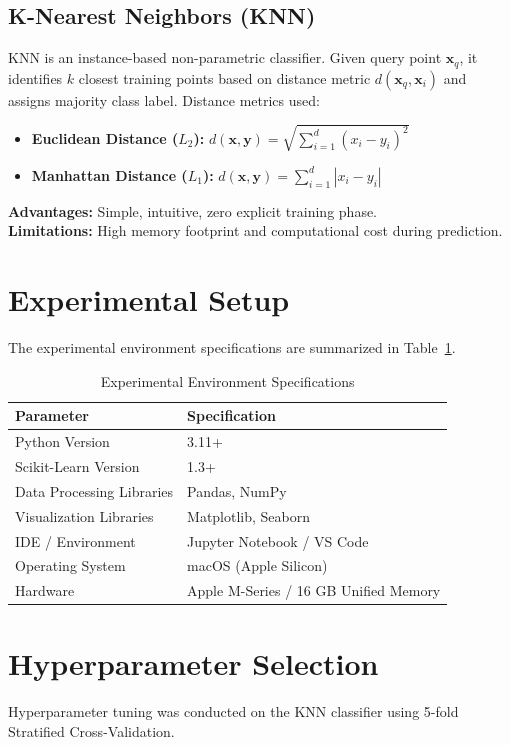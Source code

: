 \documentclass[12pt,a4paper]{article}
\begin{document}
\subsection{K-Nearest Neighbors (KNN)}
KNN is an instance-based non-parametric classifier. Given query point $\mathbf{x}_q$, it identifies $k$ closest training points based on distance metric $d(\mathbf{x}_q, \mathbf{x}_i)$ and assigns majority class label.
Distance metrics used:
\begin{itemize}
    \item \textbf{Euclidean Distance ($L_2$):} $d(\mathbf{x}, \mathbf{y}) = \sqrt{\sum_{i=1}^d (x_i - y_i)^2}$
    \item \textbf{Manhattan Distance ($L_1$):} $d(\mathbf{x}, \mathbf{y}) = \sum_{i=1}^d |x_i - y_i|$
\end{itemize}
\textbf{Advantages:} Simple, intuitive, zero explicit training phase.\\
\textbf{Limitations:} High memory footprint and computational cost during prediction.

\section{Experimental Setup}
The experimental environment specifications are summarized in Table~\ref{tab:experimental_setup}.

\begin{table}[H]
\centering
\caption{Experimental Environment Specifications} \label{tab:experimental_setup}
\vspace{0.2cm}
\begin{tabular}{ll}
\toprule
\textbf{Parameter} & \textbf{Specification} \\
\midrule
Python Version & 3.11+ \\
Scikit-Learn Version & 1.3+ \\
Data Processing Libraries & Pandas, NumPy \\
Visualization Libraries & Matplotlib, Seaborn \\
IDE / Environment & Jupyter Notebook / VS Code \\
Operating System & macOS (Apple Silicon) \\
Hardware & Apple M-Series / 16 GB Unified Memory \\
\bottomrule
\end{tabular}
\end{table}

\section{Hyperparameter Selection}
Hyperparameter tuning was conducted on the KNN classifier using 5-fold Stratified Cross-Validation.
\end{document}
